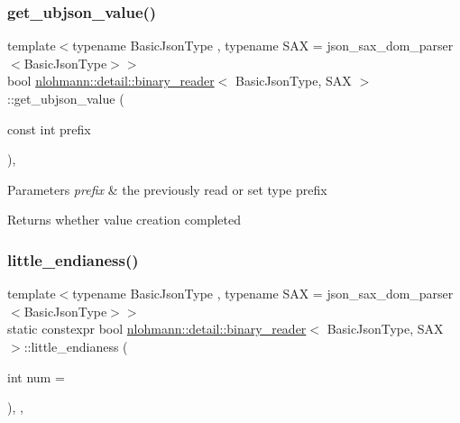 \subsubsection{\texorpdfstring{get\+\_\+ubjson\+\_\+value()}{get\_ubjson\_value()}}
{\footnotesize\ttfamily template$<$typename Basic\+Json\+Type , typename S\+AX  = json\+\_\+sax\+\_\+dom\+\_\+parser$<$\+Basic\+Json\+Type$>$$>$ \\
bool \mbox{\hyperlink{classnlohmann_1_1detail_1_1binary__reader}{nlohmann\+::detail\+::binary\+\_\+reader}}$<$ Basic\+Json\+Type, S\+AX $>$\+::get\+\_\+ubjson\+\_\+value (\begin{DoxyParamCaption}\item[{const int}]{prefix }\end{DoxyParamCaption})\hspace{0.3cm}{\ttfamily [inline]}, {\ttfamily [private]}}


\begin{DoxyParams}{Parameters}
{\em prefix} & the previously read or set type prefix \\
\hline
\end{DoxyParams}
\begin{DoxyReturn}{Returns}
whether value creation completed 
\end{DoxyReturn}
\mbox{\label{classnlohmann_1_1detail_1_1binary__reader_a1e31dbfcf9567c8c2d4f0e4eb1b0230a}} 
\subsubsection{\texorpdfstring{little\+\_\+endianess()}{little\_endianess()}}
{\footnotesize\ttfamily template$<$typename Basic\+Json\+Type , typename S\+AX  = json\+\_\+sax\+\_\+dom\+\_\+parser$<$\+Basic\+Json\+Type$>$$>$ \\
static constexpr bool \mbox{\hyperlink{classnlohmann_1_1detail_1_1binary__reader}{nlohmann\+::detail\+::binary\+\_\+reader}}$<$ Basic\+Json\+Type, S\+AX $>$\+::little\+\_\+endianess (\begin{DoxyParamCaption}\item[{int}]{num = {} }\end{DoxyParamCaption})\hspace{0.3cm}{\ttfamily [inline]}, {\ttfamily [static]}, {\ttfamily [noexcept]}}




